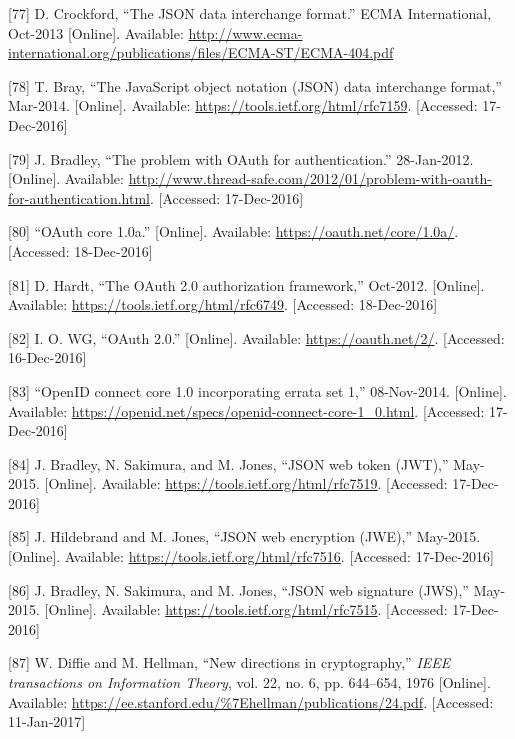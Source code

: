 \documentclass[12pt,english,a4paper,titlepage,cleardoublepage=empty,dottedtoc]{report}
\begin{document}
\hypertarget{ref-web_spec_json}{}
{[}77{]} D. Crockford, ``The JSON data interchange format.'' ECMA
International, Oct-2013 {[}Online{]}. Available:
\url{http://www.ecma-international.org/publications/files/ECMA-ST/ECMA-404.pdf}

\hypertarget{ref-web_rfc_json}{}
{[}78{]} T. Bray, ``The JavaScript object notation (JSON) data
interchange format,'' Mar-2014. {[}Online{]}. Available:
\url{https://tools.ietf.org/html/rfc7159}. {[}Accessed: 17-Dec-2016{]}

\hypertarget{ref-web_2012_problem-with-oauth-for-authentication}{}
{[}79{]} J. Bradley, ``The problem with OAuth for authentication.''
28-Jan-2012. {[}Online{]}. Available:
\url{http://www.thread-safe.com/2012/01/problem-with-oauth-for-authentication.html}.
{[}Accessed: 17-Dec-2016{]}

\hypertarget{ref-web_spec_oauth-1a}{}
{[}80{]} ``OAuth core 1.0a.'' {[}Online{]}. Available:
\url{https://oauth.net/core/1.0a/}. {[}Accessed: 18-Dec-2016{]}

\hypertarget{ref-web_spec_oauth-2}{}
{[}81{]} D. Hardt, ``The OAuth 2.0 authorization framework,'' Oct-2012.
{[}Online{]}. Available: \url{https://tools.ietf.org/html/rfc6749}.
{[}Accessed: 18-Dec-2016{]}

\hypertarget{ref-web_2016_oauth-2}{}
{[}82{]} I. O. WG, ``OAuth 2.0.'' {[}Online{]}. Available:
\url{https://oauth.net/2/}. {[}Accessed: 16-Dec-2016{]}

\hypertarget{ref-web_spec_openid-connect-1}{}
{[}83{]} ``OpenID connect core 1.0 incorporating errata set 1,''
08-Nov-2014. {[}Online{]}. Available:
\url{https://openid.net/specs/openid-connect-core-1_0.html}.
{[}Accessed: 17-Dec-2016{]}

\hypertarget{ref-web_spec_json-web-token}{}
{[}84{]} J. Bradley, N. Sakimura, and M. Jones, ``JSON web token
(JWT),'' May-2015. {[}Online{]}. Available:
\url{https://tools.ietf.org/html/rfc7519}. {[}Accessed: 17-Dec-2016{]}

\hypertarget{ref-web_spec_json-web-encryption}{}
{[}85{]} J. Hildebrand and M. Jones, ``JSON web encryption (JWE),''
May-2015. {[}Online{]}. Available:
\url{https://tools.ietf.org/html/rfc7516}. {[}Accessed: 17-Dec-2016{]}

\hypertarget{ref-web_spec_json-web-signature}{}
{[}86{]} J. Bradley, N. Sakimura, and M. Jones, ``JSON web signature
(JWS),'' May-2015. {[}Online{]}. Available:
\url{https://tools.ietf.org/html/rfc7515}. {[}Accessed: 17-Dec-2016{]}

\hypertarget{ref-paper_1976_d-h-key-exchange}{}
{[}87{]} W. Diffie and M. Hellman, ``New directions in cryptography,''
\emph{IEEE transactions on Information Theory}, vol. 22, no. 6, pp.
644--654, 1976 {[}Online{]}. Available:
\url{https://ee.stanford.edu/\%7Ehellman/publications/24.pdf}.
{[}Accessed: 11-Jan-2017{]}
\end{document}

